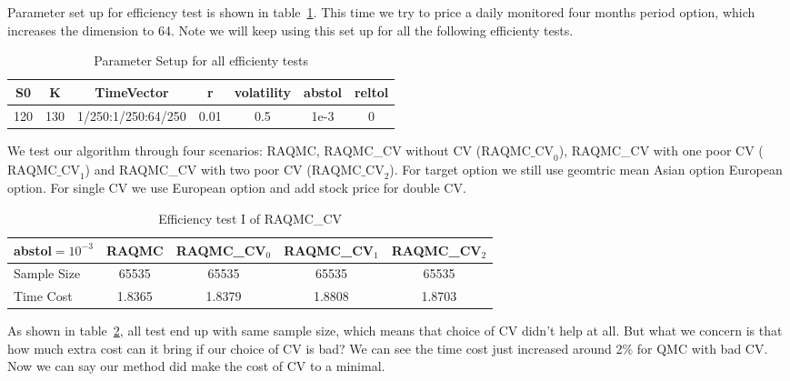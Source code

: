 Parameter set up for efficiency test is shown in table~\ref{tb:effsetup}. 
This time we try to price a daily monitored four months period option, which increases the dimension to 64. 
Note we will keep using this set up for all the following efficienty tests. 
\begin{table}[h]
    \centering
	\caption{Parameter Setup for all efficienty tests}
    \label{tb:effsetup}
	\begin{tabular}{ccccccc}
		\hline\hline
        S0 & K & TimeVector & r & volatility & abstol & reltol \\[0.5ex]
        \hline
        120  & 130 & 1/250:1/250:64/250 & 0.01 & 0.5 & 1e-3 & 0\\[1ex] 
        \hline
	\end{tabular}
\end{table}
We test our algorithm through four scenarios: RAQMC, RAQMC\_CV without CV ($\textrm{RAQMC\_CV}_0$), 
RAQMC\_CV with one poor CV ($\textrm{RAQMC\_CV}_1$) and RAQMC\_CV with two poor CV ($\textrm{RAQMC\_CV}_2$). 
For target option we still use geomtric mean Asian option European option. For single CV we use European option and add stock price for double CV. 
\begin{table}[h]
    \centering
	\caption{Efficiency test I of RAQMC\_CV}
    \label{tb:efftest1}
    \begin{tabular}{lcccc}  
    \hline\hline
    \hline
    abstol$=10^{-3}$&RAQMC&RAQMC\_CV$_0$&RAQMC\_CV$_1$& RAQMC\_CV$_2$\\[0.5ex]
    \hline
    Sample Size	&65535&65535&65535&65535\\[1ex]
    Time Cost &1.8365&1.8379 &1.8808 &1.8703\\[1ex]
   \hline
	\end{tabular}
\end{table}
As shown in table~\ref{tb:efftest1}, all test end up with same sample size, which means that choice of CV didn't help at all. 
But what we concern is that how much extra cost can it bring if our choice of CV is bad? We can see the time cost just increased around 2\% for QMC with bad CV. Now we can say our method did make the cost of CV to a minimal.  

